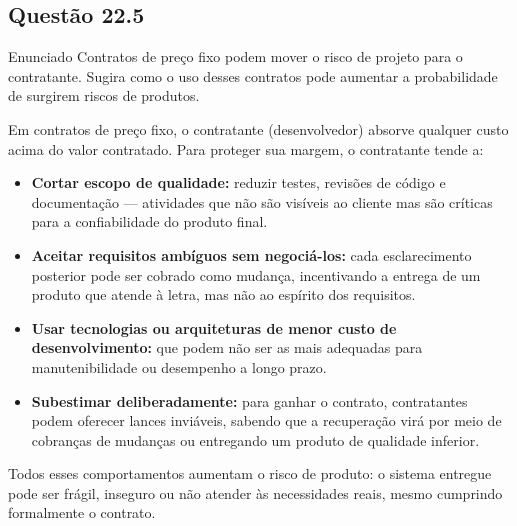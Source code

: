 \documentclass[12pt,a4paper]{article}
\begin{document}
\subsection*{Questão 22.5}
\begin{questao}{Enunciado}
Contratos de preço fixo podem mover o risco de projeto para o contratante.
Sugira como o uso desses contratos pode aumentar a probabilidade de surgirem
riscos de produtos.
\end{questao}
\begin{resposta}
Em contratos de preço fixo, o contratante (desenvolvedor) absorve qualquer
custo acima do valor contratado. Para proteger sua margem, o contratante
tende a:

\begin{itemize}[nosep]
  \item \textbf{Cortar escopo de qualidade:} reduzir testes, revisões de
        código e documentação — atividades que não são visíveis ao cliente
        mas são críticas para a confiabilidade do produto final.
  \item \textbf{Aceitar requisitos ambíguos sem negociá-los:} cada
        esclarecimento posterior pode ser cobrado como mudança, incentivando
        a entrega de um produto que atende à letra, mas não ao espírito dos
        requisitos.
  \item \textbf{Usar tecnologias ou arquiteturas de menor custo de
        desenvolvimento:} que podem não ser as mais adequadas para
        manutenibilidade ou desempenho a longo prazo.
  \item \textbf{Subestimar deliberadamente:} para ganhar o contrato,
        contratantes podem oferecer lances inviáveis, sabendo que a
        recuperação virá por meio de cobranças de mudanças ou entregando
        um produto de qualidade inferior.
\end{itemize}

Todos esses comportamentos aumentam o risco de produto: o sistema entregue
pode ser frágil, inseguro ou não atender às necessidades reais, mesmo
cumprindo formalmente o contrato.
\end{resposta}

\end{document}
